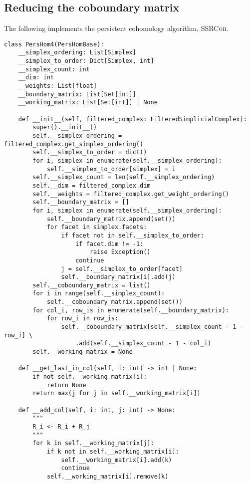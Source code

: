 \subsection{Reducing the coboundary matrix}

The following implements the persistent cohomology algorithm, \textsc{SSRCoh}.

\begin{verbatim}
class PersHom4(PersHomBase):
    __simplex_ordering: List[Simplex]
    __simplex_to_order: Dict[Simplex, int]
    __simplex_count: int
    __dim: int
    __weights: List[float]
    __boundary_matrix: List[Set[int]]
    __working_matrix: List[Set[int]] | None

    def __init__(self, filtered_complex: FilteredSimplicialComplex):
        super().__init__()
        self.__simplex_ordering = filtered_complex.get_simplex_ordering()
        self.__simplex_to_order = dict()
        for i, simplex in enumerate(self.__simplex_ordering):
            self.__simplex_to_order[simplex] = i
        self.__simplex_count = len(self.__simplex_ordering)
        self.__dim = filtered_complex.dim
        self.__weights = filtered_complex.get_weight_ordering()
        self.__boundary_matrix = []
        for i, simplex in enumerate(self.__simplex_ordering):
            self.__boundary_matrix.append(set())
            for facet in simplex.facets:
                if facet not in self.__simplex_to_order:
                    if facet.dim != -1:
                        raise Exception()
                    continue
                j = self.__simplex_to_order[facet]
                self.__boundary_matrix[i].add(j)
        self.__coboundary_matrix = list()
        for i in range(self.__simplex_count):
            self.__coboundary_matrix.append(set())
        for col_i, row_is in enumerate(self.__boundary_matrix):
            for row_i in row_is:
                self.__coboundary_matrix[self.__simplex_count - 1 - row_i] \
                    .add(self.__simplex_count - 1 - col_i)
        self.__working_matrix = None

    def __get_last_in_col(self, i: int) -> int | None:
        if not self.__working_matrix[i]:
            return None
        return max(j for j in self.__working_matrix[i])

    def __add_col(self, i: int, j: int) -> None:
        """
        R_i <- R_i + R_j
        """
        for k in self.__working_matrix[j]:
            if k not in self.__working_matrix[i]:
                self.__working_matrix[i].add(k)
                continue
            self.__working_matrix[i].remove(k)


\end{verbatim}
